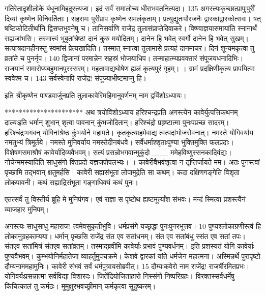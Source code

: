 गतिरेतादृशीलोके बंधूनामिहदुस्त्यजा।
 इदं सर्वं समालोच्य धीराभवतनित्यदा।
 135
अगस्त्यःकृच्छात्प्रापुःपुरीं दिव्यां कृष्णेन विनिवर्तिताः।
 सहरामः पुरीप्राप कृष्णेन समलंकृताम्।
 प्रत्युद्युतःपौरजनैः द्वारकांद्वारकोत्सवः।
 षत् षष्टिकोटितीर्थानि द्विसप्तभुवनेषु च।
 तानिसर्वाणि राजेंद्र तुलासंप्राप्तेदिवाकरे।
 विष्ण्वाज्ञयासमायांति स्नानार्थं सह्यजांभसि।
 तस्मात्त्वं भूबृतांश्रेष्ठ! दानं कुरु मयोदितम्।
 दानेन हि भवेत् स्वर्गो दानेन हि भवेत् सुखम्।
 सत्पात्रदानहीनस्तु स्वमांसं प्रेत्यखादिति।
 तस्मात् स्नात्वा तुलामासे प्रत्यहं दानमाचर।
 दिनं शून्यमकृत्वा तु व्रतांते च पुनर्नृप।
 140 द्विजानां परमान्नेन सहस्रं भोजयाधिप।
 तन्माहात्म्यप्रवक्तारं संपूजयधनादिभिः।
 राजयानं समारोप्यबहुमानपुरस्सरम्।
 महतावाद्यघोषेण ह्यलं कृत्यपुरं गृहम्।
 ।
 ग्रामं प्रदक्षिणीकृत्य प्रापयित्वा स्ववेश्म च।
 143 सर्वस्वेनापि राजेंद्र! संपूज्याभीष्टमाप्नु हि।
 
इति श्रीकृष्णेन पाण्डवार्जुनप्रति तुलाकावेरिमहिमानुवर्णनम् नाम द्वविंशोऽध्यायः।

**********************
अथ त्रयोविंशोऽध्याय हरिश्चन्द्रप्रति अगस्त्येन कावेर्युत्पत्तिकथनम् दाल्यःइति धर्मान् शुभान् शृत्वा पावनान् कुंभजोदितान्।
 हरिश्चंद्रो प्रहृष्टात्मा पुनःपप्रच्छ सादरम्।
 हरिश्चंद्रःभगवन् योगिनांश्रेष्ठ कुंभयोने महामते।
 कृतकृत्याहमेवाद्य त्वत्पदांभोजसेवनात्।
 नमस्ते योगिवर्याय नमतुभ्यं त्रिमूर्तये।
 नमस्ते मुनिवर्याय नमस्तेदीनबंधवे।
 सर्वेधर्माश्शृताःपुण्या भुक्तिमुक्ति फलप्रदाः।
 विशेषणसमाश्रौषं कावेर्यादिव्यवैभवम्।
 सत्यं प्रसन्नोभगवान्मुकुंदो
___ ममेहविष्णुस्सनकादिवंद्यः।
 नोचेन्ममस्यादिति साधुसंगो
क्तिप्रदो यज्ञजपोपलभ्यः।
।
 कावेरीवैभवंशृत्वा न तृप्तिर्जायते मम।
 अतः पुनस्त्वां पृच्छामि तद्भवान् क्षतुमर्हसि।
 कावेरी सह्यसंभूता लोपामुद्रेति सा कथम्।
 कदा दक्षिणगङ्गेति विशृता लोकपावनी।
 कथं सह्याद्रिसंभूता गङ्गाधिक्यं कथं पुनः।
 
एतत्सर्वं तु विस्तीर्य ब्रूहि मे मुनिपंगव।
 एवं राज्ञा स पृष्टोथ ह्यष्टमूर्त्यांश संभवः।
 मन्दं स्मित्वा प्रशस्त्यैनं व्याजहार मुनिपम्।
 
अगस्त्यः
साधुसाधु महाराज! त्वमेवसुकृतीभुवि।
 धर्मप्रसंगे यच्छ्रद्धा पुनःपुनरभूत्तव।
 10 पुण्यश्लोकाग्रणीस्त्वं हि लोकानुग्रहकाम्यया।
 धर्मान् पृच्छसि राजेंद्र संत एव सतांधनम्।
 संत एव सतांबंधु स्संत एव सतां तपः।
 संतएव सतांमित्रं संतएव सतांव्रतम्।
 तस्माद्ब्रवीमि कावेर्याः प्रभावं पुण्यवर्धनम्।
 इति प्रशस्यतं योगि कावेर्याः पुण्यवैभवम्।
 कुम्भयोनिर्महातेजा व्याहर्तुमुपचक्रमे।
 केशवे द्वारकां यांते धर्मजेन महात्मना।
 अस्मिन्नर्थे पुरापृष्टो दौम्यनाममहामुनिः।
 कावेरी संभवं सर्वं धर्मपुत्रायसोब्रवीत्।
 15 दौम्यःकवेरो नाम राजेंद्र! राजर्षीरमितप्रभः।
 योगिवर्यःप्रसन्नात्मा सर्वविद्या विशारदः।
 जितेंद्रियोजिताहारो निस्संगो निष्परिग्रहः।
 विरक्तस्सर्वधर्मेषु किंचित्कालं तु कर्मठः।
 मुमुक्षुरभवच्छ्रीमान् कर्मकृत्वा सुदुष्करम्।
 
